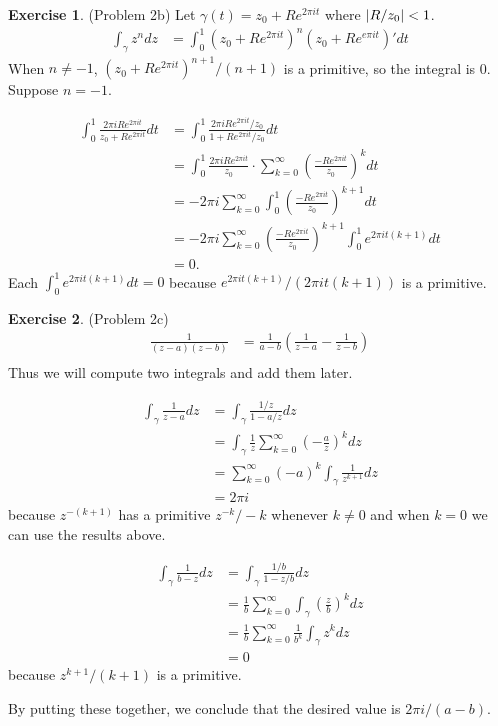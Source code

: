 \documentclass[12pt, psamsfonts]{amsart}
\theoremstyle{definition}
\newtheorem*{exer}{Exercise}
\theoremstyle{remark}
\numberwithin{equation}{section}
\begin{document}
\begin{exer}{(Problem 2b)}
  Let $\gamma(t) = z_0 + Re^{2\pi it}$ where $\abs{R / z_0} < 1$.
  \begin{align*}
    \int_{\gamma} z^ndz
      &= \int_{0}^{1} (z_0 + Re^{2\pi it})^n(z_0 + Re^{e\pi it})' dt
  \end{align*}
  When $n \ne -1$, $(z_0 + Re^{2\pi it})^{n + 1} / (n + 1)$ is a primitive, so the integral is 0.
  Suppose $n = -1$.

  \begin{align*}
    \int_{0}^{1} \frac{2 \pi i Re^{2\pi it}}{z_0 + Re^{2\pi i t}} dt
      &= \int_{0}^{1} \frac{2 \pi i Re^{2\pi it} / z_0}{1 + Re^{2\pi i t} / z_0} dt \\
      &= \int_{0}^{1} \frac{2\pi i Re^{2\pi it}}{z_0} \cdot \sum_{k=0}^{\infty} (\frac{-Re^{2\pi it}}{z_0})^kdt \\
      &= -2\pi i\sum_{k=0}^{\infty} \int_0^1 (\frac{-Re^{2\pi it}}{z_0})^{k + 1} dt \\
      &= -2\pi i\sum_{k=0}^{\infty} (\frac{-Re^{2\pi it}}{z_0})^{k + 1}\int_0^1 e^{2\pi i t(k + 1)} dt \\
      &= 0.
  \end{align*}
  Each $\int_0^1 e^{2\pi i t(k + 1)} dt = 0$ because $e^{2\pi it(k + 1)} / (2\pi i t(k + 1))$ is a primitive.
\end{exer}

\begin{exer}{(Problem 2c)}
  \begin{align*}
    \frac{1}{(z - a)(z - b)}
      &= \frac{1}{a - b}(\frac{1}{z - a} - \frac{1}{z - b}) \\
  \end{align*}
  Thus we will compute two integrals and add them later.

  \begin{align*}
    \int_{\gamma} \frac{1}{z - a} dz
      &= \int_{\gamma} \frac{1 / z}{1 - a / z} dz \\
      &= \int_{\gamma} \frac{1}{z} \sum_{k=0}^{\infty} (-\frac{a}{z})^k dz \\
      &= \sum_{k=0}^{\infty} (-a)^k\int_{\gamma} \frac{1}{z^{k + 1}} dz \\
      &= 2\pi i
  \end{align*}
  because $z^{-(k + 1)}$ has a primitive $z^{-k}/-k$ whenever $k \ne 0$ and when $k = 0$ we can use the results above.

  \begin{align*}
    \int_{\gamma} \frac{1}{b - z} dz
      &= \int_{\gamma} \frac{1 / b}{1 - z / b} dz \\
      &= \frac{1}{b} \sum_{k=0}^{\infty} \int_{\gamma} (\frac{z}{b})^k dz \\
      &= \frac{1}{b} \sum_{k=0}^{\infty} \frac{1}{b^k} \int_{\gamma} z^k dz \\
      &= 0
  \end{align*}
  because $z^{k + 1} / (k + 1)$ is a primitive.

  By putting these together, we conclude that the desired value is $2\pi i / (a - b)$.
\end{exer}
\end{document}
